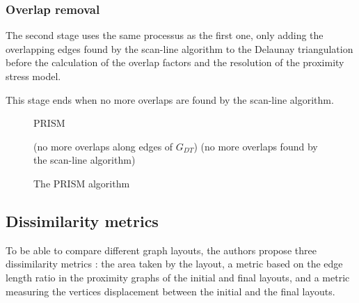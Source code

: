 \documentclass[12pt]{report}
\begin{document}
\subsubsection{Overlap removal}

The second stage uses the same processus as the first one, only adding the overlapping edges found by the scan-line algorithm to the Delaunay triangulation before the calculation of the overlap factors and the resolution of the proximity stress model.

This stage ends when no more overlaps are found by the scan-line algorithm.

\begin{figure}
\begin{algorithm}[H]
\caption{PRISM}
	 
(no more overlaps along edges of $G_{DT}$)
\BlankLine
{}	
(no more overlaps found by the scan-line algorithm)
\end{algorithm}
\caption{The PRISM algorithm}
\end{figure}

\subsection{Dissimilarity metrics}

To be able to compare different graph layouts, the authors propose three dissimilarity metrics : the area taken by the layout, a metric based on the edge length ratio in the proximity graphs of the initial and final layouts, and a metric measuring the vertices displacement between the initial and the final layouts.
\end{document}
